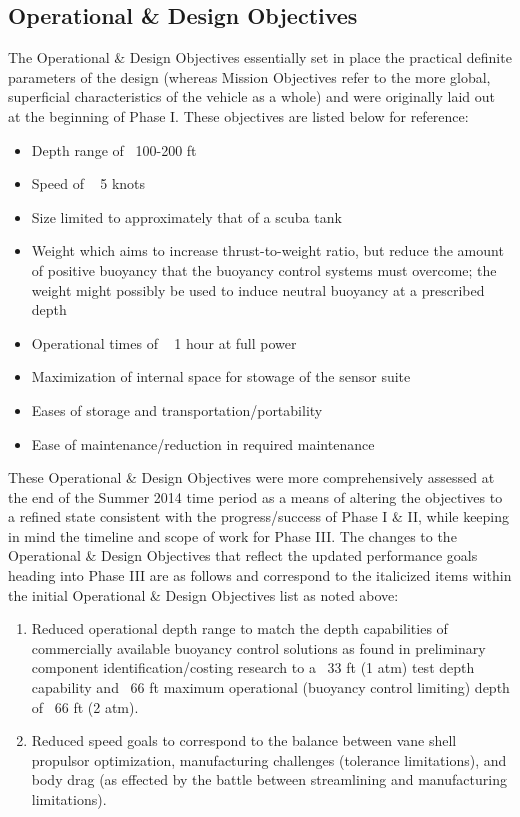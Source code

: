 \documentclass{report}
\begin{document}
\subsection{Operational \& Design Objectives}
The Operational \& Design Objectives essentially set in place the practical definite parameters of the design (whereas Mission Objectives refer to the more global, superficial characteristics of the vehicle as a whole) and were originally laid out at the beginning of Phase I.  These objectives are listed below for reference:
\begin{itemize}
\item Depth range of ~100-200 ft
\item Speed of ~ 5 knots
\item Size limited to approximately that of a scuba tank
\item Weight which aims to increase thrust-to-weight ratio, but reduce the amount of positive buoyancy that the buoyancy control systems must overcome; the weight might possibly be used to induce neutral buoyancy at a prescribed depth
\item Operational times of ~ 1 hour at full power
\item Maximization of internal space for stowage of the sensor suite
\item Eases of storage and transportation/portability
\item Ease of maintenance/reduction in required maintenance
\end{itemize}
These Operational \& Design Objectives were more comprehensively assessed at the end of the Summer 2014 time period as a means of altering the objectives to a refined state consistent with the progress/success of Phase I \& II, while keeping in mind the timeline and scope of work for Phase III.  The changes to the Operational \& Design Objectives that reflect the updated performance goals heading into Phase III are as follows and correspond to the italicized items within the initial Operational \& Design Objectives list as noted above:
\begin{enumerate}
\item Reduced operational depth range to match the depth capabilities of commercially available buoyancy control solutions as found in preliminary component identification/costing research to a ~33 ft (1 atm) test depth capability and ~66 ft maximum operational (buoyancy control limiting) depth of ~66 ft (2 atm).
\item Reduced speed goals to correspond to the balance between vane shell propulsor optimization, manufacturing challenges (tolerance limitations), and body drag (as effected by the battle between streamlining and manufacturing limitations).
\end{enumerate}
\end{document}
